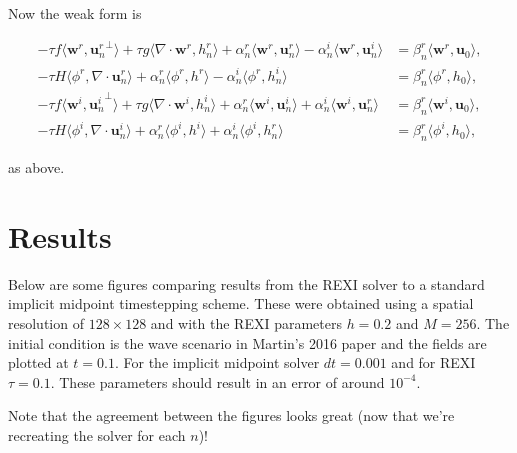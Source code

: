 \documentclass[14pt]{article}
\def\MM#1{\boldsymbol{#1}}
\begin{document}
Now the weak form is

\begin{align}
  -\tau f\langle\MM{w}^r, {\MM{u}_n^r}^\perp\rangle + \tau g\langle\nabla\cdot\MM{w}^r, h_n^r\rangle + \alpha_n^r\langle\MM{w}^r, \MM{u}_n^r\rangle - \alpha_n^i\langle\MM{w}^r, \MM{u}_n^i\rangle &= \beta_n^r\langle\MM{w}^r, \MM{u}_0\rangle, \\
  -\tau H\langle\phi^r, \nabla\cdot\MM{u}_n^r\rangle + \alpha_n^r\langle\phi^r, h^r\rangle - \alpha_n^i\langle\phi^r, h_n^i\rangle & = \beta_n^r \langle\phi^r, h_0\rangle, \\
  -\tau f\langle\MM{w}^i, {\MM{u}_n^i}^\perp\rangle + \tau g\langle\nabla\cdot\MM{w}^i, h_n^i\rangle + \alpha_n^r\langle\MM{w}^i, \MM{u}_n^i\rangle + \alpha_n^i\langle\MM{w}^i, \MM{u}_n^r\rangle &= \beta_n^r\langle\MM{w}^i, \MM{u}_0\rangle, \\
  -\tau H\langle\phi^i, \nabla\cdot\MM{u}_n^i\rangle + \alpha_n^r\langle\phi^i, h^i\rangle + \alpha_n^i\langle\phi^i, h_n^r\rangle & = \beta_n^r \langle\phi^i, h_0\rangle,
\end{align}

\noindent as above.

\section{Results}

Below are some figures comparing results from the REXI solver to a
standard implicit midpoint timestepping scheme. These were obtained
using a spatial resolution of $128\times 128$ and with the REXI
parameters $h=0.2$ and $M=256$. The initial condition is the wave
scenario in Martin's 2016 paper and the fields are plotted at
$t=0.1$. For the implicit midpoint solver $dt=0.001$ and for REXI
$\tau=0.1$. These parameters should result in an error of around
$10^{-4}$.

Note that the agreement between the figures looks great (now that we're recreating the solver for each $n$)!
\end{document}
